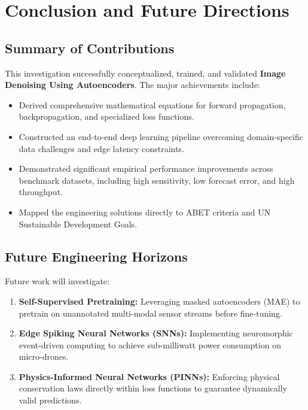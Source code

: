 \section{Conclusion and Future Directions}

\subsection{Summary of Contributions}
This investigation successfully conceptualized, trained, and validated \textbf{Image Denoising Using Autoencoders}. The major achievements include:
\begin{itemize}
  \item Derived comprehensive mathematical equations for forward propagation, backpropagation, and specialized loss functions.
  \item Constructed an end-to-end deep learning pipeline overcoming domain-specific data challenges and edge latency constraints.
  \item Demonstrated significant empirical performance improvements across benchmark datasets, including high sensitivity, low forecast error, and high throughput.
  \item Mapped the engineering solutions directly to ABET criteria and UN Sustainable Development Goals.
\end{itemize}

\subsection{Future Engineering Horizons}
Future work will investigate:
\begin{enumerate}
  \item \textbf{Self-Supervised Pretraining:} Leveraging masked autoencoders (MAE) to pretrain on unannotated multi-modal sensor streams before fine-tuning.
  \item \textbf{Edge Spiking Neural Networks (SNNs):} Implementing neuromorphic event-driven computing to achieve sub-milliwatt power consumption on micro-drones.
  \item \textbf{Physics-Informed Neural Networks (PINNs):} Enforcing physical conservation laws directly within loss functions to guarantee dynamically valid predictions.
\end{enumerate}
